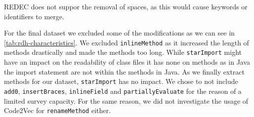 \documentclass[%
class=scrreprt,
chapterprefix=false,%
open=right,%
twoside=false,%
paper=a4,%
logofile={Logo\_zentral\_farbig\_EN.png},%
thesistype=master,%
UKenglish,%
]{se2thesis}
\theoremstyle{definition}
\newcommand{\rdh}{REDEC\xspace}
\begin{document}
	
	\rdh does not suppor the removal of spaces, as this would cause keywords or identifiers to merge.
	

	For the final dataset we excluded some of the modifications as we can see in \autoref{tab:rdh-characteristics}.
	We excluded \texttt{inlineMethod} as it increased the length of methods drastically and made the methods too long.
	While \texttt{starImport} might have an impact on the readability of class files it has none on methods as in Java the import statement are not within the methods in Java. As we finally extract methods for our dataset, \texttt{starImport} has no impact.
	We chose to not include \texttt{add0}, \texttt{insertBraces}, \texttt{inlineField} and \texttt{partiallyEvaluate} for the reason of a limited survey capacity.
	For the same reason, we did not investigate the usage of Code2Vec for \texttt{renameMethod} either.
\end{document}
